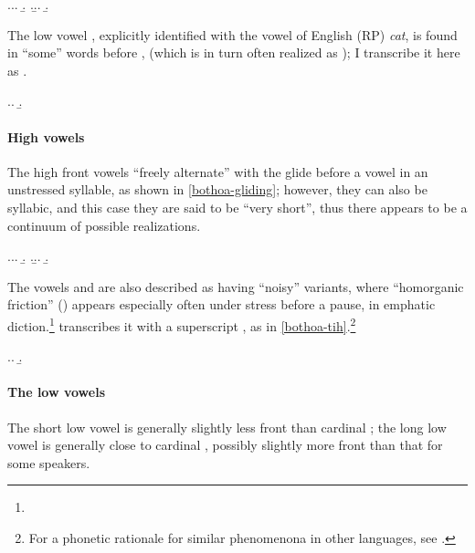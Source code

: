 \ex.\a.\a.
\b.
\z.\b.\a.
\b.

The low vowel , explicitly identified with the vowel of English (RP) \emph{cat}, is found in \enquote{some} words before \ipa{[h]}, \ipa{[r̥]} (which is in turn often realized as ); I transcribe it here as .

\ex.\label{erch-chwech}\a.
\b.

\paragraph{High vowels}
\label{sec:high-vowels}

The high front vowels  \enquote{freely alternate} with the glide  before a vowel in an unstressed syllable, as shown in \cref{bothoa-gliding}; however, they can also be syllabic, and this case they are said to be \enquote{very short}, thus there appears to be a continuum of possible realizations.

\ex.\label{bothoa-gliding}\a.\a.
\b.
\z.\b.\a.
\b.

The vowels \ipa{[i]} and \ipa{[y]} are also described as having \enquote{noisy} variants, where \enquote{homorganic friction} () appears especially often under stress before a pause, in emphatic diction.\footnote{} \citet{humphreys95:_phonol_bothoa_saint_nicol_pelem} transcribes it with a superscript \ipa{[ʰ]}, as in \cref{bothoa-tih}.\footnote{For a phonetic rationale for  similar phenomenona in other languages, see \citet{ohala:_turbul}.}

\ex.\label{bothoa-tih}\a.
\b.


\paragraph{The low vowels}
\label{sec:low-vowels}


The short low vowel  is generally slightly less front than cardinal \ipa{[a]}; the long low vowel is generally close to cardinal \ipa{[ɑː]}, possibly slightly more front than that for some speakers.

